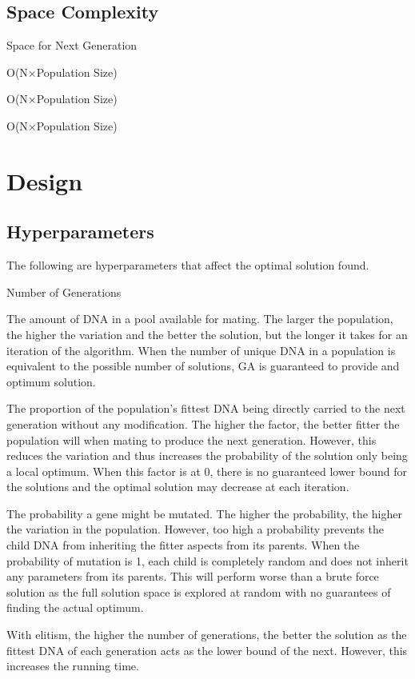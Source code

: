 \documentclass[sigconf]{acmart}
\begin{document}
\subsection{Space Complexity}
\begin{labeling}{Space for Next Generation\quad}
  \item[Space for Population] O(N×Population Size)
  \item[Space for Next Generation] O(N×Population Size)
  \item[Total Space Complexity] O(N×Population Size)
\end{labeling}

\section{Design}
\subsection{Hyperparameters}
The following are hyperparameters that affect the optimal solution found.
\begin{labeling}{Number of Generations\quad}
  \item[Population Size] The amount of DNA in a pool available for mating. The larger the population, the higher the variation and the better the solution, but the longer it takes for an iteration of the algorithm. When the number of unique DNA in a population is equivalent to the possible number of solutions, GA is guaranteed to provide and optimum solution.
  \item[Elitism Factor] The proportion of the population’s fittest DNA being directly carried to the next generation without any modification. The higher the factor, the better fitter the population will when mating to produce the next generation. However, this reduces the variation and thus increases the probability of the solution only being a local optimum. When this factor is at 0, there is no guaranteed lower bound for the solutions and the optimal solution may decrease at each iteration.
  \item[Mutation Probability] The probability a gene might be mutated. The higher the probability, the higher the variation in the population. However, too high a probability prevents the child DNA from inheriting the fitter aspects from its parents. When the probability of mutation is 1, each child is completely random and does not inherit any parameters from its parents. This will perform worse than a brute force solution as the full solution space is explored at random with no guarantees of finding the actual optimum.
  \item[Number of Generations] With elitism, the higher the number of generations, the better the solution as the fittest DNA of each generation acts as the lower bound of the next. However, this increases the running time.
\end{labeling}
\end{document}
